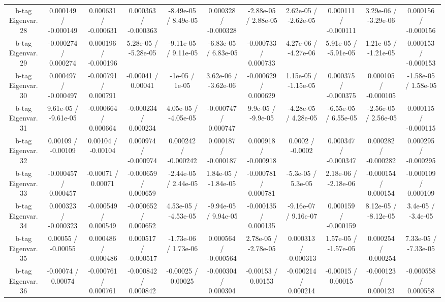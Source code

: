 \begin{table}[htbp]
\begin{center}
\begin{tabular}{|c|c|c|c|c|c|c|c|c|c|c|}
  b-tag Eigenvar. 28 & 0.000149 / -0.000149 & 0.000631 / -0.000631 & 0.000363 / -0.000363 & -8.49e-05 / 8.49e-05 & 0.000328 / -0.000328 & -2.88e-05 / 2.88e-05 & 2.62e-05 / -2.62e-05 & 0.000111 / -0.000111 & 3.29e-06 / -3.29e-06 & 0.000156 / -0.000156 \\ 
  b-tag Eigenvar. 29 & -0.000274 / 0.000274 & 0.000196 / -0.000196 & 5.28e-05 / -5.28e-05 & -9.11e-05 / 9.11e-05 & -6.83e-05 / 6.83e-05 & -0.000733 / 0.000733 & 4.27e-06 / -4.27e-06 & 5.91e-05 / -5.91e-05 & 1.21e-05 / -1.21e-05 & 0.000153 / -0.000153 \\ 
  b-tag Eigenvar. 30 & 0.000497 / -0.000497 & -0.000791 / 0.000791 & -0.00041 / 0.00041 & -1e-05 / 1e-05 & 3.62e-06 / -3.62e-06 & -0.000629 / 0.000629 & 1.15e-05 / -1.15e-05 & 0.000375 / -0.000375 & 0.000105 / -0.000105 & -1.58e-05 / 1.58e-05 \\ 
  b-tag Eigenvar. 31 & 9.61e-05 / -9.61e-05 & -0.000664 / 0.000664 & -0.000234 / 0.000234 & 4.05e-05 / -4.05e-05 & -0.000747 / 0.000747 & 9.9e-05 / -9.9e-05 & -4.28e-05 / 4.28e-05 & -6.55e-05 / 6.55e-05 & -2.56e-05 / 2.56e-05 & 0.000115 / -0.000115 \\ 
  b-tag Eigenvar. 32 & 0.00109 / -0.00109 & 0.00104 / -0.00104 & 0.000974 / -0.000974 & 0.000242 / -0.000242 & 0.000187 / -0.000187 & 0.000918 / -0.000918 & 0.0002 / -0.0002 & 0.000347 / -0.000347 & 0.000282 / -0.000282 & 0.000295 / -0.000295 \\ 
  b-tag Eigenvar. 33 & -0.000457 / 0.000457 & -0.00071 / 0.00071 & -0.000659 / 0.000659 & -2.44e-05 / 2.44e-05 & 1.84e-05 / -1.84e-05 & -0.000781 / 0.000781 & -5.3e-05 / 5.3e-05 & 2.18e-06 / -2.18e-06 & -0.000154 / 0.000154 & -0.000109 / 0.000109 \\ 
  b-tag Eigenvar. 34 & 0.000323 / -0.000323 & -0.000549 / 0.000549 & -0.000652 / 0.000652 & 4.53e-05 / -4.53e-05 & -9.94e-05 / 9.94e-05 & -0.000135 / 0.000135 & -9.16e-07 / 9.16e-07 & 0.000159 / -0.000159 & 8.12e-05 / -8.12e-05 & 3.4e-05 / -3.4e-05 \\ 
  b-tag Eigenvar. 35 & 0.00055 / -0.00055 & 0.000486 / -0.000486 & 0.000517 / -0.000517 & -1.73e-06 / 1.73e-06 & 0.000564 / -0.000564 & 2.78e-05 / -2.78e-05 & 0.000313 / -0.000313 & 1.57e-05 / -1.57e-05 & 0.000254 / -0.000254 & 7.33e-05 / -7.33e-05 \\ 
  b-tag Eigenvar. 36 & -0.00074 / 0.00074 & -0.000761 / 0.000761 & -0.000842 / 0.000842 & -0.00025 / 0.00025 & -0.000304 / 0.000304 & -0.00153 / 0.00153 & -0.000214 / 0.000214 & -0.00015 / 0.00015 & -0.000123 / 0.000123 & -0.000558 / 0.000558 \\ 

\end{tabular}
\end{center}
\end{table}
